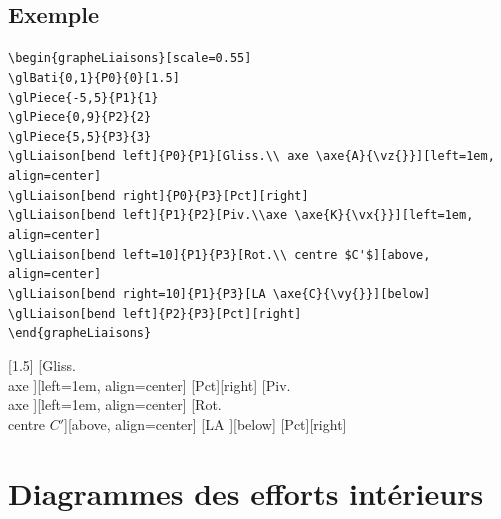 \documentclass[11pt]{ltxdockit}[2010/09/26]
\begin{document}
\subsection{Exemple}
\noindent
\verb!\begin{grapheLiaisons}[scale=0.55]!\\
\indent\verb!\glBati{0,1}{P0}{0}[1.5]!\\
\indent\verb!\glPiece{-5,5}{P1}{1}!\\
\indent\verb!\glPiece{0,9}{P2}{2}!\\
\indent\verb!\glPiece{5,5}{P3}{3}!\\
\indent\verb!\glLiaison[bend left]{P0}{P1}[Gliss.\\ axe \axe{A}{\vz{}}][left=1em, align=center]!\\
\indent\verb!\glLiaison[bend right]{P0}{P3}[Pct][right]!\\
\indent\verb!\glLiaison[bend left]{P1}{P2}[Piv.\\axe \axe{K}{\vx{}}][left=1em, align=center]!\\
\indent\verb!\glLiaison[bend left=10]{P1}{P3}[Rot.\\ centre $C'$][above, align=center]!\\
\indent\verb!\glLiaison[bend right=10]{P1}{P3}[LA \axe{C}{\vy{}}][below]!\\
\indent\verb!\glLiaison[bend left]{P2}{P3}[Pct][right]!\\
\verb!\end{grapheLiaisons}!

\begin{center}
\begin{grapheLiaisons}[scale=0.55]
[1.5]
[Gliss.\\ axe ][left=1em, align=center]
[Pct][right]
[Piv.\\axe {}][left=1em, align=center]
[Rot.\\ centre $C'$][above, align=center]
[LA ][below]
[Pct][right]
\end{grapheLiaisons}
\end{center}

\section{Diagrammes des efforts intérieurs}
\end{document}
